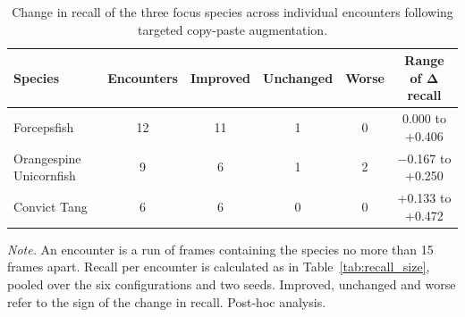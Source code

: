 \begin{table}[htbp]
    \centering
    \caption[Change in focus-species recall by encounter]{Change in recall of the three focus species across individual encounters following targeted copy-paste augmentation.}
    \label{tab:recall_encounter}
    \small
    \setlength{\tabcolsep}{6pt}
    \renewcommand{\arraystretch}{1.15}
    \begin{tabular}{lccccc}
        \toprule
        \textbf{Species} & \textbf{Encounters} & \textbf{Improved} & \textbf{Unchanged} & \textbf{Worse} & \textbf{Range of $\boldsymbol{\Delta}$ recall} \\
        \midrule
        Forcepsfish             & 12 & 11 & 1 & 0 & 0.000 to +0.406 \\
        Orangespine Unicornfish & 9  & 6  & 1 & 2 & $-$0.167 to +0.250 \\
        Convict Tang            & 6  & 6  & 0 & 0 & +0.133 to +0.472 \\
        \bottomrule
    \end{tabular}

    \vspace{3pt}
    \begin{minipage}{\linewidth}
    \footnotesize\textit{Note.} An encounter is a run of frames containing the species no more than 15 frames apart.
    Recall per encounter is calculated as in Table~\ref{tab:recall_size}, pooled over the six configurations and two seeds.
    Improved, unchanged and worse refer to the sign of the change in recall. Post-hoc analysis.
    \end{minipage}
\end{table}
